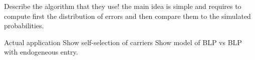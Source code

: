 \documentclass{beamer}
\begin{document}
\begin{frame}
    Describe the algorithm that they use! the main idea is simple and requires to compute first the distribution of errors and then compare them to the simulated probabilities. 
\end{frame}

\begin{frame}
    Actual application
    Show self-selection of carriers
    Show model of BLP vs BLP with endogeneous entry. 

\end{frame}
\end{document}
